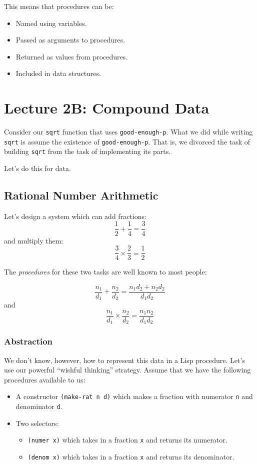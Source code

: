 \documentclass[9pt]{report}
\begin{document}
This means that procedures can be:
\begin{itemize}
\item Named using variables.
\item Passed as arguments to procedures.
\item Returned as values from procedures.
\item Included in data structures.
\end{itemize}

\chapter{Lecture 2B: Compound Data}
\label{sec:org764002b}

Consider our \texttt{sqrt} function that uses \texttt{good-enough-p}. What we did
while writing \texttt{sqrt} is assume the existence of \texttt{good-enough-p}.
That is, we divorced the task of building \texttt{sqrt} from the task of
implementing its parts.

Let's do this for data.

\section{Rational Number Arithmetic}
\label{sec:orgeae7ec3}

Let's design a system which can add fractions:
$$\frac{1}{2}+\frac{1}{4}=\frac{3}{4}$$
and multiply them:
$$\frac{3}{4}\times \frac{2}{3} = \frac{1}{2}$$

The \emph{procedures} for these two tasks are well known to most people:

$$\frac{n_1}{d_1} + \frac{n_2}{d_2} = \frac{n_1d_2+n_2d_2}{d_1d_2}$$
and
$$\frac{n_1}{d_1} \times \frac{n_2}{d_2} = \frac{n_1n_2}{d_1d_2}$$

\subsection{Abstraction}
\label{sec:org6c6c056}
We don't know, however, how to represent this data in a Lisp
procedure. Let's use our powerful ``wishful thinking'' strategy.
Assume that we have the following procedures available to us:

\begin{itemize}
\item A constructor \texttt{(make-rat n d)} which makes a fraction with
numerator \texttt{n} and denominator \texttt{d}.
\item Two selectors:
\begin{itemize}
\item \texttt{(numer x)} which takes in a fraction \texttt{x} and returns its
numerator.
\item \texttt{(denom x)} which takes in a fraction \texttt{x} and returns its
denominator.
\end{itemize}
\end{itemize}
\end{document}
